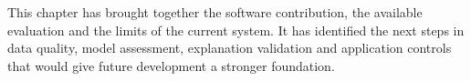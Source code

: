 \par\medskip\noindent
This chapter has brought together the software contribution, the available evaluation and the limits of the current system. It has identified the next steps in data quality, model assessment, explanation validation and application controls that would give future development a stronger foundation.
